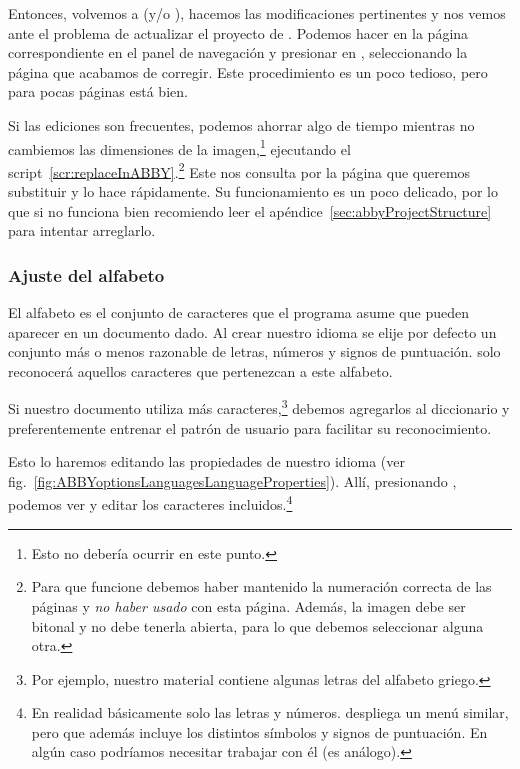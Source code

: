 \documentclass[%
	a5paper,
	10pt,
	twoside,
	openright,
	final,
]{memoir}
\begin{document}
	Entonces, volvemos a \scantailor (y/o \gimp), hacemos las modificaciones pertinentes y nos vemos ante el problema de actualizar el proyecto de \abby. Podemos hacer  en la página correspondiente en el panel de navegación y presionar en , seleccionando la página que acabamos de corregir. Este procedimiento es un poco tedioso, pero para pocas páginas está bien.

	Si las ediciones son frecuentes, podemos ahorrar algo de tiempo mientras no cambiemos las dimensiones de la imagen,\footnote{Esto no debería ocurrir en este punto.} ejecutando el script~\ref{scr:replaceInABBY}.\footnote{Para que funcione debemos haber mantenido la numeración correcta de las páginas y \emph{no haber usado}  con esta página. Además, la imagen debe ser bitonal y \abby no debe tenerla abierta, para lo que debemos seleccionar alguna otra.} Este nos consulta por la página que queremos substituir y lo hace rápidamente. Su funcionamiento es un poco delicado, por lo que si no funciona bien recomiendo leer el apéndice~\ref{sec:abbyProjectStructure} para intentar arreglarlo.


	\subsubsection{Ajuste del alfabeto} El alfabeto es el conjunto de caracteres que el programa asume que pueden aparecer en un documento dado. Al crear nuestro idioma se elije por defecto un conjunto más o menos razonable de letras, números y signos de puntuación. \abby solo reconocerá aquellos caracteres que pertenezcan a este alfabeto.

	Si nuestro documento utiliza más caracteres,\footnote{Por ejemplo, nuestro material contiene algunas letras del alfabeto griego.} debemos agregarlos al diccionario y preferentemente entrenar el patrón de usuario para facilitar su reconocimiento.

	Esto lo haremos editando las propiedades de nuestro idioma (ver fig.~\ref{fig:ABBYoptionsLanguagesLanguageProperties}). Allí, presionando \keys{\raisebox{.25em}{\...}}, podemos ver y editar los caracteres incluidos.\footnote{En realidad básicamente solo las letras y números.  despliega un menú similar, pero que además incluye los distintos símbolos y signos de puntuación. En algún caso podríamos necesitar trabajar con él (es análogo).}
\end{document}
